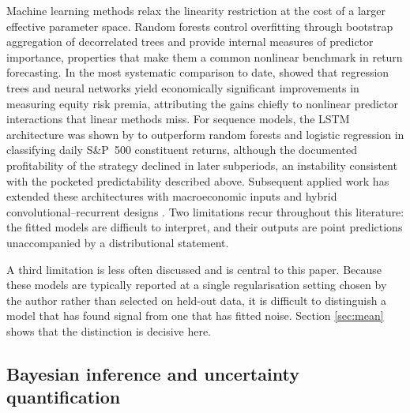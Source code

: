 Machine learning methods relax the linearity restriction at the cost of a larger
effective parameter space. Random forests \citep{breiman2001random} control
overfitting through bootstrap aggregation of decorrelated trees and provide
internal measures of predictor importance, properties that make them a common
nonlinear benchmark in return forecasting. In the most systematic comparison to
date, \citet{gu2020empirical} showed that regression trees and neural networks
yield economically significant improvements in measuring equity risk premia,
attributing the gains chiefly to nonlinear predictor interactions that linear
methods miss. For sequence models, the LSTM architecture
\citep{hochreiter1997long} was shown by \citet{fischer2018deep} to outperform
random forests and logistic regression in classifying daily S\&P~500 constituent
returns, although the documented profitability of the strategy declined in later
subperiods, an instability consistent with the pocketed predictability described
above. Subsequent applied work has extended these architectures with
macroeconomic inputs and hybrid convolutional--recurrent designs
\citep{latif2025integrating}. Two limitations recur throughout this literature:
the fitted models are difficult to interpret, and their outputs are point
predictions unaccompanied by a distributional statement.

A third limitation is less often discussed and is central to this paper. Because
these models are typically reported at a single regularisation setting chosen by
the author rather than selected on held-out data, it is difficult to distinguish
a model that has found signal from one that has fitted noise. Section
\ref{sec:mean} shows that the distinction is decisive here.

\subsection{Bayesian inference and uncertainty quantification}

